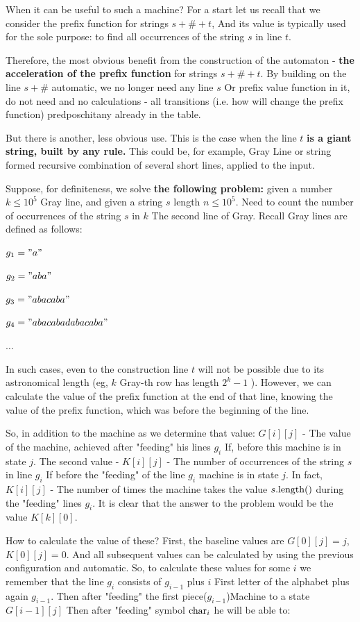 When it can be useful to such a machine? For a start let us recall that we consider the prefix function for strings $s + \# + t$, And its value is typically used for the sole purpose: to find all occurrences of the string $s$ in line $t$.

Therefore, the most obvious benefit from the construction of the automaton - \textbf{the acceleration of the prefix function} for strings $s + \# + t$. By building on the line $s + \#$ automatic, we no longer need any line $s$ Or prefix value function in it, do not need and no calculations - all transitions (i.e. how will change the prefix function) predposchitany already in the table.

But there is another, less obvious use. This is the case when the line $t$ \textbf{is a giant string, built by any rule.} This could be, for example, Gray Line or string formed recursive combination of several short lines, applied to the input.

Suppose, for definiteness, we solve \textbf{the following problem:} given a number $k \le 10 ^ 5$ Gray line, and given a string $s$ length $n \le 10 ^ 5$. Need to count the number of occurrences of the string $s$ in $k$ The second line of Gray. Recall Gray lines are defined as follows:

$g_1 =" a" $

$g_2 =" aba" $

$g_3 =" abacaba" $

$g_4 =" abacabadabacaba" $

$\ldots$

In such cases, even to the construction line $t$ will not be possible due to its astronomical length (eg, $k$ Gray-th row has length $2 ^ k-1$ ). However, we can calculate the value of the prefix function at the end of that line, knowing the value of the prefix function, which was before the beginning of the line.

So, in addition to the machine as we determine that value: $G [i][j]$ - The value of the machine, achieved after "feeding" his lines $g_i$ If, before this machine is in state $j$. The second value - $K [i][j]$ - The number of occurrences of the string $s$ in line $g_i$ If before the "feeding" of the line $g_i$ machine is in state $j$. In fact, $K [i][j]$ - The number of times the machine takes the value $s. {\rm length}()$ during the "feeding" lines $g_i$. It is clear that the answer to the problem would be the value $K [k][0]$.

How to calculate the value of these? First, the baseline values ​​are $G [0][j] = j$, $K [0][j] = 0$. And all subsequent values ​​can be calculated by using the previous configuration and automatic. So, to calculate these values ​​for some $i$ we remember that the line $g_i$ consists of $g_ {i-1}$ plus $i$ First letter of the alphabet plus again $g_ {i-1}$. Then after "feeding" the first piece($g_ {i-1}$)Machine to a state $G [i-1][j]$ Then after "feeding" symbol ${\rm char} _i$ he will be able to:

